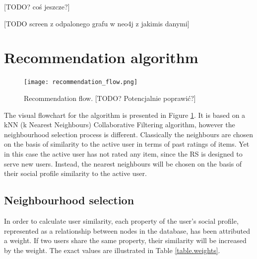 \documentclass[12pt]{report}
\begin{document}
[TODO? coś jeszcze?]

\hbox{}
[TODO screen z odpalonego grafu w neo4j z jakimis danymi]

\section{Recommendation algorithm}


\begin{figure}
\centering
\texttt{[image: recommendation\_flow.png]} 
\caption[Recommendation flow.]{Recommendation flow. [TODO? Potencjalnie poprawić?]}
\label{fig.recommendation_flow}
\end{figure}

The visual flowchart for the algorithm is presented in Figure \ref{fig.recommendation_flow}. It is based on a kNN (k Nearest Neighbours) Collaborative Filtering algorithm, however the neighbourhood selection process is different. Classically the neighbours are chosen on the basis of similarity to the active user in terms of past ratings of items. Yet in this case the active user has not rated any item, since the RS is designed to serve new users. Instead, the nearest neighbours will be chosen on the basis of their social profile similarity to the active user.

\subsection{Neighbourhood selection}

In order to calculate user similarity, each property of the user's social profile, represented as a relationship between nodes in the database, has been attributed a weight. If two users share the same property, their similarity will be increased by the weight. The exact values are illustrated in Table \ref{table.weights}.

\end{document}
